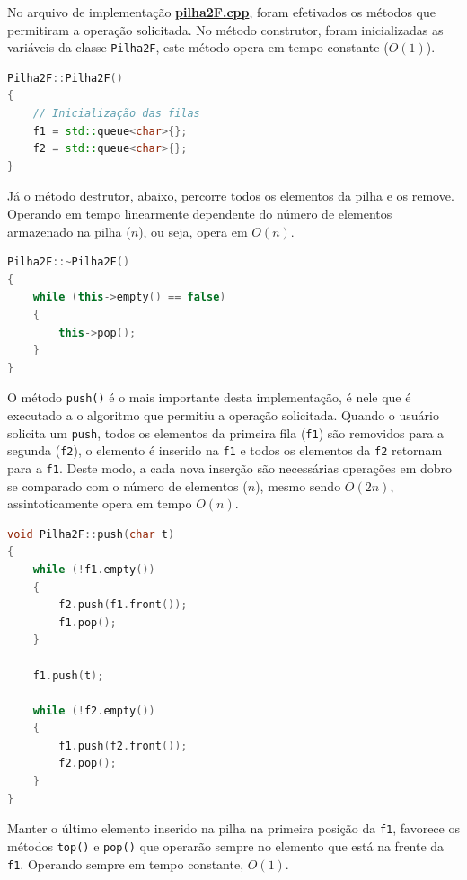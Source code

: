 \documentclass[
  brazilian,
  paper=a4,
  oneside  ,captions=tableheading
]{scrbook}
\newcommand{\passthrough}[1]{#1}
\begin{document}
No arquivo de implementação
\href{https://github.com/ecostadelle/lista_pilhas_filas/blob/main/include/pilha2F.cpp}{\textbf{pilha2F.cpp}},
foram efetivados os métodos que permitiram a operação solicitada. No
método construtor, foram inicializadas as variáveis da classe
\passthrough{\lstinline!Pilha2F!}, este método opera em tempo constante
(\(O(1)\)).

\begin{lstlisting}[language={C++}]
Pilha2F::Pilha2F()
{
    // Inicialização das filas
    f1 = std::queue<char>{};
    f2 = std::queue<char>{};
}
\end{lstlisting}

Já o método destrutor, abaixo, percorre todos os elementos da pilha e os
remove. Operando em tempo linearmente dependente do número de elementos
armazenado na pilha (\(n\)), ou seja, opera em \(O(n)\).

\begin{lstlisting}[language={C++}]
Pilha2F::~Pilha2F()
{
    while (this->empty() == false)
    {
        this->pop();
    }
}
\end{lstlisting}

O método \passthrough{\lstinline!push()!} é o mais importante desta
implementação, é nele que é executado a o algoritmo que permitiu a
operação solicitada. Quando o usuário solicita um
\passthrough{\lstinline!push!}, todos os elementos da primeira fila
(\passthrough{\lstinline!f1!}) são removidos para a segunda
(\passthrough{\lstinline!f2!}), o elemento é inserido na
\passthrough{\lstinline!f1!} e todos os elementos da
\passthrough{\lstinline!f2!} retornam para a
\passthrough{\lstinline!f1!}. Deste modo, a cada nova inserção são
necessárias operações em dobro se comparado com o número de elementos
(\(n\)), mesmo sendo \(O(2n)\), assintoticamente opera em tempo
\(O(n)\).

\begin{lstlisting}[language={C++}]
void Pilha2F::push(char t)
{
    while (!f1.empty())
    {
        f2.push(f1.front());
        f1.pop();
    }

    f1.push(t);

    while (!f2.empty())
    {
        f1.push(f2.front());
        f2.pop();
    }
}
\end{lstlisting}

Manter o último elemento inserido na pilha na primeira posição da
\passthrough{\lstinline!f1!}, favorece os métodos
\passthrough{\lstinline!top()!} e \passthrough{\lstinline!pop()!} que
operarão sempre no elemento que está na frente da
\passthrough{\lstinline!f1!}. Operando sempre em tempo constante,
\(O(1)\).
\end{document}
